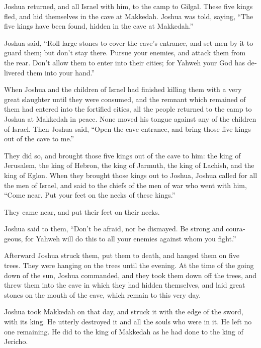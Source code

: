 \begin{paracol}{2}
\begin{otherlanguage}{english}
 Joshua returned, and all Israel with him, to the camp to
Gilgal.  These five kings fled, and hid themselves in the
cave at Makkedah.  Joshua was told, saying, ``The five
kings have been found, hidden in the cave at Makkedah.''

 Joshua said, ``Roll large stones to cover the cave's
entrance, and set men by it to guard them;  but don't
stay there. Pursue your enemies, and attack them from the rear. Don't
allow them to enter into their cities; for Yahweh your God has delivered
them into your hand.''

 When Joshua and the children of Israel had finished
killing them with a very great slaughter until they were consumed, and
the remnant which remained of them had entered into the fortified
cities,  all the people returned to the camp to Joshua at
Makkedah in peace. None moved his tongue against any of the children of
Israel.  Then Joshua said, ``Open the cave entrance, and
bring those five kings out of the cave to me.''

 They did so, and brought those five kings out of the
cave to him: the king of Jerusalem, the king of Hebron, the king of
Jarmuth, the king of Lachish, and the king of Eglon. 
When they brought those kings out to Joshua, Joshua called for all the
men of Israel, and said to the chiefs of the men of war who went with
him, ``Come near. Put your feet on the necks of these kings.''

They came near, and put their feet on their necks.

 Joshua said to them, ``Don't be afraid, nor be dismayed.
Be strong and courageous, for Yahweh will do this to all your enemies
against whom you fight.''

 Afterward Joshua struck them, put them to death, and
hanged them on five trees. They were hanging on the trees until the
evening.  At the time of the going down of the sun,
Joshua commanded, and they took them down off the trees, and threw them
into the cave in which they had hidden themselves, and laid great stones
on the mouth of the cave, which remain to this very day.

 Joshua took Makkedah on that day, and struck it with the
edge of the sword, with its king. He utterly destroyed it and all the
souls who were in it. He left no one remaining. He did to the king of
Makkedah as he had done to the king of Jericho.


\end{otherlanguage}
\end{paracol}
